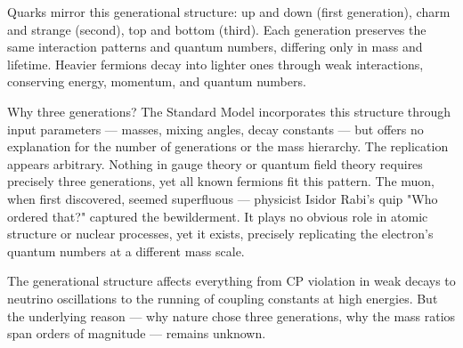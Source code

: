 Quarks mirror this generational structure: up and down (first generation), charm and strange (second), top and bottom (third). Each generation preserves the same interaction patterns and quantum numbers, differing only in mass and lifetime. Heavier fermions decay into lighter ones through weak interactions, conserving energy, momentum, and quantum numbers.

Why three generations? The Standard Model incorporates this structure through input parameters — masses, mixing angles, decay constants — but offers no explanation for the number of generations or the mass hierarchy. The replication appears arbitrary. Nothing in gauge theory or quantum field theory requires precisely three generations, yet all known fermions fit this pattern. The muon, when first discovered, seemed superfluous — physicist Isidor Rabi's quip "Who ordered that?" captured the bewilderment. It plays no obvious role in atomic structure or nuclear processes, yet it exists, precisely replicating the electron's quantum numbers at a different mass scale.

The generational structure affects everything from CP violation in weak decays to neutrino oscillations to the running of coupling constants at high energies. But the underlying reason — why nature chose three generations, why the mass ratios span orders of magnitude — remains unknown.

\newpage
{}
